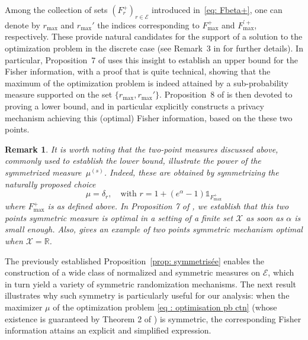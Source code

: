 \documentclass[a4paper, 11pt]{article}
\newtheorem{rem}{Remark}
\theoremstyle{definition}
\newcommand{\modar}{\color{black}}
\newcommand{\indi}[1]{\mathds{1}_{#1}}
\begin{document}
{Among the collection of sets \( (F_r^+)_{r \in \mathcal{E}} \) introduced in~\eqref{eq: Fbeta+}, one can denote by \( r_{\max} \) and \( r_{\max}' \) the indices corresponding to \( F_{\max}^+ \) and \( F_{\max}^{\prime +} \), respectively. These provide natural candidates for the support of a solution to the optimization problem in the discrete case (see Remark~3 in \cite{amorino2025factorization} for further details). In particular, Proposition~7 of \cite{amorino2025factorization} uses this insight to establish an upper bound for the Fisher information, with a proof that is quite technical, showing that the maximum of the optimization problem is indeed attained by a sub-probability measure supported on the set \( \{ r_{\max}, r_{\max}' \} \). Proposition~8 of \cite{amorino2025factorization} is then devoted to proving a lower bound, and in particular explicitly constructs a privacy mechanism achieving this (optimal) Fisher information, based on the these two points.  

\begin{rem}{\label{rk: symmetry start}}
It is worth noting that the two-point measures discussed above, commonly used to establish the lower bound, illustrate the power of the symmetrized measure~$\mu^{(s)}$. Indeed, these are obtained by symmetrizing the naturally proposed choice
\[
\mu = \delta_r, \quad
\text{with } r = 1 + (e^\alpha - 1) \indi{F_{\max}^+}
\]
where \( F_{\max}^+ \) is as defined above. 
{\modar In Proposition 7 of \cite{amorino2025factorization}, we establish that this two points symmetric measure is optimal in a setting of a finite set $\mathcal{X}$ as soon as  $\alpha$ is small enough. Also, \cite{kalinin2024efficient} gives an example of two points symmetric mechanism optimal when $\mathcal{X}=\mathbb{R}$.}
\end{rem}

The previously established Proposition~\ref{prop: symmetrisée} enables the construction of a wide class of normalized and symmetric measures on $\mathcal{E}$, which in turn yield a variety of symmetric randomization mechanisms. The next result illustrates why such symmetry is particularly useful for our analysis: when the maximizer $\mu$ of the optimization problem \eqref{eq : optimisation pb ctn} (whose existence is guaranteed by Theorem 2 of \cite{amorino2025factorization}) is symmetric, the corresponding Fisher information attains an explicit and simplified expression.

}
\end{document}
